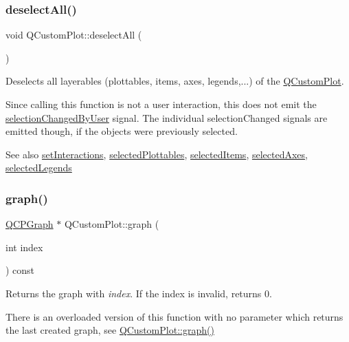 \subsubsection{\texorpdfstring{deselect\+All()}{deselectAll()}}
{\footnotesize\ttfamily void Q\+Custom\+Plot\+::deselect\+All (\begin{DoxyParamCaption}{ }\end{DoxyParamCaption})}

Deselects all layerables (plottables, items, axes, legends,...) of the \mbox{\hyperlink{class_q_custom_plot}{Q\+Custom\+Plot}}.

Since calling this function is not a user interaction, this does not emit the \mbox{\hyperlink{class_q_custom_plot_a500c64a109bc773c973ad274f2fa4190}{selection\+Changed\+By\+User}} signal. The individual selection\+Changed signals are emitted though, if the objects were previously selected.

\begin{DoxySeeAlso}{See also}
\mbox{\hyperlink{class_q_custom_plot_a5ee1e2f6ae27419deca53e75907c27e5}{set\+Interactions}}, \mbox{\hyperlink{class_q_custom_plot_a747faaab57c56891e901a1e97fa4359a}{selected\+Plottables}}, \mbox{\hyperlink{class_q_custom_plot_afda487bcf2d6cf1a57173d82495e29ba}{selected\+Items}}, \mbox{\hyperlink{class_q_custom_plot_a7e6b07792b1cb2c31681596582d14dbe}{selected\+Axes}}, \mbox{\hyperlink{class_q_custom_plot_ac87624ddff1cbf4064781a8e8ae321c4}{selected\+Legends}} 
\end{DoxySeeAlso}
\mbox{\label{class_q_custom_plot_a6ecae130f684b25276fb47bd3a5875c6}} 
\subsubsection{\texorpdfstring{graph()}{graph()}\hspace{0.1cm}{\footnotesize\ttfamily [1/2]}}
{\footnotesize\ttfamily \mbox{\hyperlink{class_q_c_p_graph}{Q\+C\+P\+Graph}} $\ast$ Q\+Custom\+Plot\+::graph (\begin{DoxyParamCaption}\item[{int}]{index }\end{DoxyParamCaption}) const}

Returns the graph with {\itshape index}. If the index is invalid, returns 0.

There is an overloaded version of this function with no parameter which returns the last created graph, see \mbox{\hyperlink{class_q_custom_plot_a6ecae130f684b25276fb47bd3a5875c6}{Q\+Custom\+Plot\+::graph()}}


